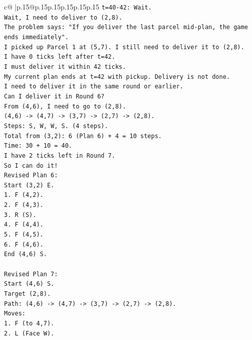 \documentclass{article}
\begin{document}
{\begin{supertabular}{c@{$\;$}|p{.15\linewidth}@{}p{.15\linewidth}p{.15\linewidth}p{.15\linewidth}p{.15\linewidth}p{.15\linewidth}}
{{{\texttt{t=40{-}42: Wait.} \\
\texttt{Wait, I need to deliver to (2,8).} \\
\texttt{The problem says: "If you deliver the last parcel mid{-}plan, the game ends immediately".} \\
\texttt{I picked up Parcel 1 at (5,7). I still need to deliver it to (2,8).} \\
\texttt{I have 0 ticks left after t=42.} \\
\texttt{I must deliver it within 42 ticks.} \\
\texttt{My current plan ends at t=42 with pickup. Delivery is not done.} \\
\texttt{I need to deliver it in the same round or earlier.} \\
\texttt{Can I deliver it in Round 6?} \\
\texttt{From (4,6), I need to go to (2,8).} \\
\texttt{(4,6) {-}> (4,7) {-}> (3,7) {-}> (2,7) {-}> (2,8).} \\
\texttt{Steps: S, W, W, S. (4 steps).} \\
\texttt{Total from (3,2): 6 (Plan 6) + 4 = 10 steps.} \\
\texttt{Time: 30 + 10 = 40.} \\
\texttt{I have 2 ticks left in Round 7.} \\
\texttt{So I can do it!} \\
\texttt{Revised Plan 6:} \\
\texttt{Start (3,2) E.} \\
\texttt{1. F (4,2).} \\
\texttt{2. F (4,3).} \\
\texttt{3. R (S).} \\
\texttt{4. F (4,4).} \\
\texttt{5. F (4,5).} \\
\texttt{6. F (4,6).} \\
\texttt{End (4,6) S.} \\
\\ 
\texttt{Revised Plan 7:} \\
\texttt{Start (4,6) S.} \\
\texttt{Target (2,8).} \\
\texttt{Path: (4,6) {-}> (4,7) {-}> (3,7) {-}> (2,7) {-}> (2,8).} \\
\texttt{Moves:} \\
\texttt{1. F (to 4,7).} \\
\texttt{2. L (Face W).} \\
}}}
\end{supertabular}}
\end{document}
